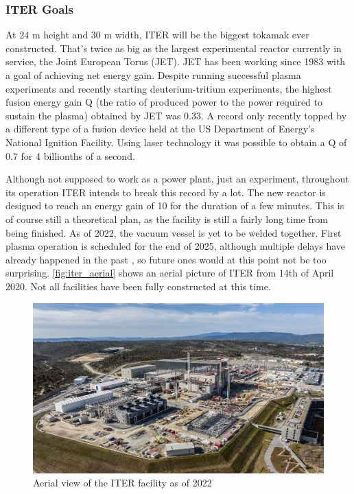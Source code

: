   \subsubsection{ITER Goals}

	At 24 m height and 30 m width, 
	ITER will be the biggest tokamak ever constructed. 
	That's twice as big as the largest experimental reactor currently in service, 
	the Joint European Torus (JET). JET has been working since 1983 with 
	a goal of achieving net energy gain. Despite running successful 
	plasma experiments and recently starting deuterium-tritium experiments,
	the highest fusion energy gain Q 
	(the ratio of produced power to the power required to sustain the plasma)
	obtained by JET was 0.33. A record only recently topped by a different 
	type of a fusion device held at the US Department of Energy’s
	National Ignition Facility. Using laser technology it was possible to
	obtain a Q of 0.7 for 4 billionths of a second. \cite{fusion_records}
	

	Although not supposed to work as a power plant, just an experiment,
	throughout its operation ITER intends to break this record by a lot.
	The new reactor is designed to reach an energy gain of 10 
	for the duration of a few minutes. This is of course still a theoretical
	plan, as the facility is still a fairly long time from being finished.
	As of 2022, the vacuum vessel is yet to be welded together\cite{iter_timeline}.
	First plasma operation is scheduled for the end of 2025\cite{iter_timeline},
	although multiple delays have already happened in the past \cite{iter_delays},
	so future ones would at this point not be too surprising. 
  \autoref{fig:iter_aerial} shows an aerial picture of ITER from 14th of April 2020.
  Not all facilities have been fully constructed at this time.
	\begin{figure}[H]
	  \centering
	  \includegraphics[width=.8\linewidth]{media/iter_aerial_2022.jpg}
	  \caption{Aerial view of the ITER facility as of 2022\cite{iter_website}}
	  \label{fig:iter_aerial}
	\end{figure}

